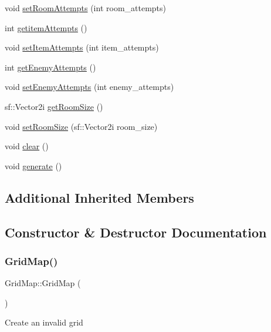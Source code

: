 \begin{DoxyCompactItemize}
\item 
void \hyperlink{classGridMap_a2537be44ba896d295fa89aa0edcbfb23}{set\+Room\+Attempts} (int room\+\_\+attempts)
\item 
int \hyperlink{classGridMap_a981cd7cdfe793fca98aa481acf4ba950}{getitem\+Attempts} ()
\item 
void \hyperlink{classGridMap_aef7fc3dcf541dbffa9e0a478790a0beb}{set\+Item\+Attempts} (int item\+\_\+attempts)
\item 
int \hyperlink{classGridMap_a65a8b002122eb5e1ed97058f7bbb3ba0}{get\+Enemy\+Attempts} ()
\item 
void \hyperlink{classGridMap_a5b8801061a33e42d0aa4a2eac05506a5}{set\+Enemy\+Attempts} (int enemy\+\_\+attempts)
\item 
sf\+::\+Vector2i \hyperlink{classGridMap_ad7f5bca4ce7d107bcf1dc152b7087b30}{get\+Room\+Size} ()
\item 
void \hyperlink{classGridMap_acf8ffcc30d3d426914a0852d08a76ce8}{set\+Room\+Size} (sf\+::\+Vector2i room\+\_\+size)
\item 
void \hyperlink{classGridMap_a58ed8ba83f589bd899fe102b659f2dd2}{clear} ()
\item 
void \hyperlink{classGridMap_a24b8545a2b1b418568374c1088e1dffa}{generate} ()
\end{DoxyCompactItemize}
\subsection*{Additional Inherited Members}


\subsection{Constructor \& Destructor Documentation}
\mbox{\label{classGridMap_a4a40d6c23a1abd369140225bd9419257}} 
\subsubsection{\texorpdfstring{Grid\+Map()}{GridMap()}\hspace{0.1cm}{\footnotesize\ttfamily [1/2]}}
{\footnotesize\ttfamily Grid\+Map\+::\+Grid\+Map (\begin{DoxyParamCaption}{ }\end{DoxyParamCaption})}

Create an invalid grid \mbox{\label{classGridMap_adff61567702379174f38423d5fd7cb7b}} 
